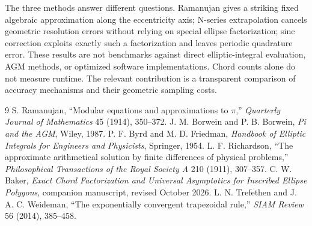 \documentclass[11pt]{article}
\begin{document}
The three methods answer different questions. Ramanujan gives a striking fixed algebraic approximation along the eccentricity axis; N-series extrapolation cancels geometric resolution errors without relying on special ellipse factorization; sinc correction exploits exactly such a factorization and leaves periodic quadrature error. These results are not benchmarks against direct elliptic-integral evaluation, AGM methods, or optimized software implementations. Chord counts alone do not measure runtime. The relevant contribution is a transparent comparison of accuracy mechanisms and their geometric sampling costs.
\begin{thebibliography}{9}
 S. Ramanujan, ``Modular equations and approximations to $\pi$,'' \emph{Quarterly Journal of Mathematics} 45 (1914), 350--372.
 J. M. Borwein and P. B. Borwein, \emph{Pi and the AGM}, Wiley, 1987.
 P. F. Byrd and M. D. Friedman, \emph{Handbook of Elliptic Integrals for Engineers and Physicists}, Springer, 1954.
 L. F. Richardson, ``The approximate arithmetical solution by finite differences of physical problems,'' \emph{Philosophical Transactions of the Royal Society A} 210 (1911), 307--357.
 C. W. Baker, \emph{Exact Chord Factorization and Universal Asymptotics for Inscribed Ellipse Polygons}, companion manuscript, revised October 2026.
 L. N. Trefethen and J. A. C. Weideman, ``The exponentially convergent trapezoidal rule,'' \emph{SIAM Review} 56 (2014), 385--458.
\end{thebibliography}
\end{document}
